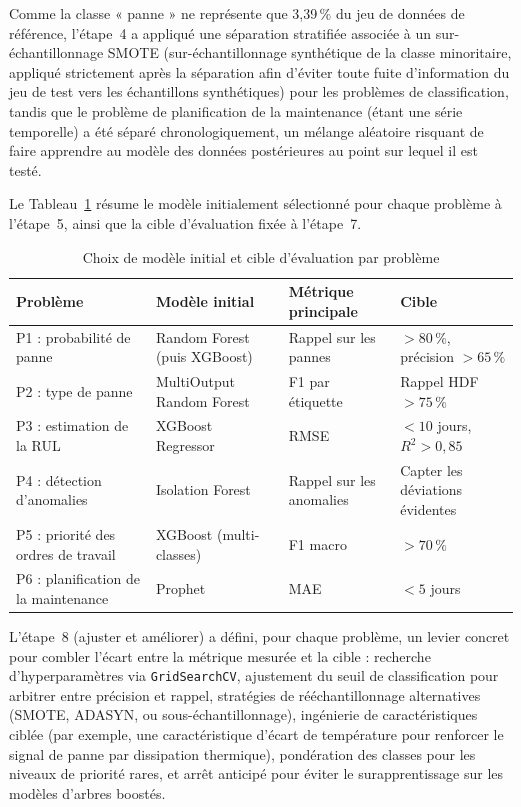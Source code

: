 Comme la classe « panne » ne représente que 3,39\,\% du jeu de données de référence, l'étape~4 a appliqué une séparation stratifiée associée à un sur-échantillonnage SMOTE (sur-échantillonnage synthétique de la classe minoritaire, appliqué strictement après la séparation afin d'éviter toute fuite d'information du jeu de test vers les échantillons synthétiques) pour les problèmes de classification, tandis que le problème de planification de la maintenance (étant une série temporelle) a été séparé chronologiquement, un mélange aléatoire risquant de faire apprendre au modèle des données postérieures au point sur lequel il est testé.

Le Tableau~\ref{tab:initial-choices} résume le modèle initialement sélectionné pour chaque problème à l'étape~5, ainsi que la cible d'évaluation fixée à l'étape~7.

\begin{table}[h]
\centering
\begin{tabularx}{\textwidth}{|X|X|X|X|}
\toprule
\textbf{Problème} & \textbf{Modèle initial} & \textbf{Métrique principale} & \textbf{Cible} \\
\midrule
P1 : probabilité de panne   & Random Forest (puis XGBoost) & Rappel sur les pannes        & $> 80\,\%$, précision $> 65\,\%$ \\
\midrule
P2 : type de panne          & MultiOutput Random Forest     & F1 par étiquette              & Rappel HDF $> 75\,\%$ \\
\midrule
P3 : estimation de la RUL        & XGBoost Regressor             & RMSE                       & $< 10$ jours, $R^2 > 0{,}85$ \\
\midrule
P4 : détection d'anomalies     & Isolation Forest              & Rappel sur les anomalies       & Capter les déviations évidentes \\
\midrule
P5 : priorité des ordres de travail   & XGBoost (multi-classes)         & F1 macro                   & $> 70\,\%$ \\
\midrule
P6 : planification de la maintenance & Prophet                      & MAE                        & $< 5$ jours \\
\bottomrule
\end{tabularx}
\caption{Choix de modèle initial et cible d'évaluation par problème}
\label{tab:initial-choices}
\end{table}

L'étape~8 (ajuster et améliorer) a défini, pour chaque problème, un levier concret pour combler l'écart entre la métrique mesurée et la cible : recherche d'hyperparamètres via \texttt{GridSearchCV}, ajustement du seuil de classification pour arbitrer entre précision et rappel, stratégies de rééchantillonnage alternatives (SMOTE, ADASYN, ou sous-échantillonnage), ingénierie de caractéristiques ciblée (par exemple, une caractéristique d'écart de température pour renforcer le signal de panne par dissipation thermique), pondération des classes pour les niveaux de priorité rares, et arrêt anticipé pour éviter le surapprentissage sur les modèles d'arbres boostés.


